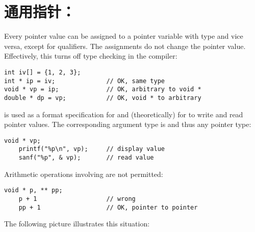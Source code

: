 \section{通用指针：}
Every pointer value can be assigned to a pointer variable with type
 and vice versa, except for  qualifiers. The
assignments do not change the pointer value. Effectively, this turns off
type checking in the compiler:
\begin{lstlisting}
int iv[] = {1, 2, 3};
int * ip = iv;				// OK, same type
void * vp = ip;				// OK, arbitrary to void *
double * dp = vp;			// OK, void * to arbitrary
\end{lstlisting}
 is used as a format specification for  and
(theoretically) for  to write and read pointer values. The
corresponding argument type is  and thus any pointer type:
\begin{lstlisting}
void * vp;
	printf("%p\n", vp);		// display value
	sanf("%p", & vp);		// read value
\end{lstlisting}
Arithmetic operations involving  are not permitted:
\begin{lstlisting}
void * p, ** pp;
	p + 1					// wrong
	pp + 1					// OK, pointer to pointer
\end{lstlisting}
The following picture illustrates this situation:

